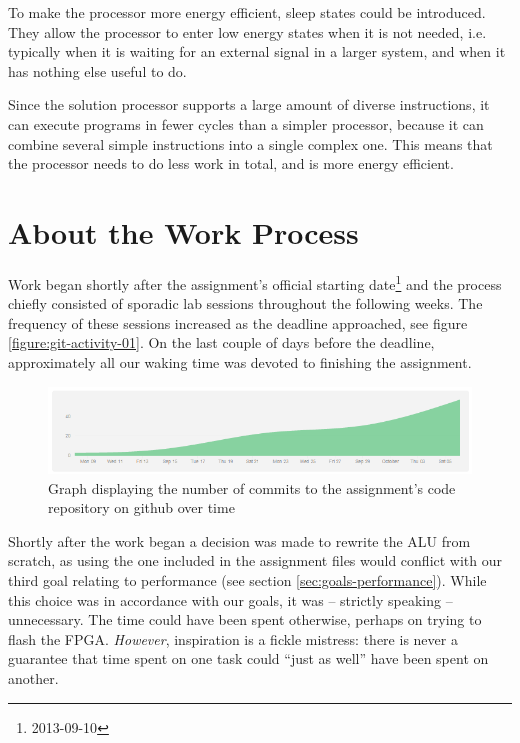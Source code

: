 To make the processor more energy efficient, sleep states could be introduced.
They allow the processor to enter low energy states when it is not needed, i.e. typically when it is waiting for an external signal in a larger system, and when it has nothing else useful to do.

Since the solution processor supports a large amount of diverse instructions, it can execute programs in fewer cycles than a simpler processor, because it can combine several simple instructions into a single complex one.
This means that the processor needs to do less work in total, and is more energy efficient.

\section{About the Work Process}

Work began shortly after the assignment's official starting date\footnote{2013-09-10} and the process chiefly consisted of sporadic lab sessions throughout the following weeks.
The frequency of these sessions increased as the deadline approached, see figure \vref{figure:git-activity-01}.
On the last couple of days before the deadline, approximately all our waking time was devoted to finishing the assignment.

\begin{figure}
	\begin{center}
		\includegraphics[keepaspectratio, width=\textwidth]{graphics/codebase.PNG}
		\caption{Graph displaying the number of commits to the assignment's code repository on github over time}
		\label{figure:git-activity-01}
	\end{center}
\end{figure}

Shortly after the work began a decision was made to rewrite the ALU from scratch, as using the one included in the assignment files would conflict with our third goal relating to performance (see section \vref{sec:goals-performance}).
While this choice was in accordance with our goals, it was -- strictly speaking -- unnecessary.
The time could have been spent otherwise, perhaps on trying to flash the FPGA.
\textit{However}, inspiration is a fickle mistress: there is never a guarantee that time spent on one task could ``just as well'' have been spent on another.

